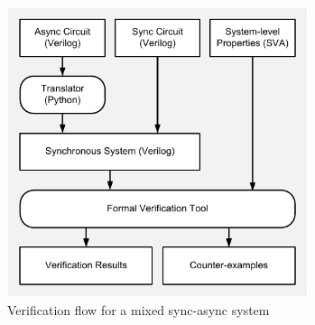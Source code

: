 
\begin{figure}[!t]
\begin{center}

\includegraphics[width=8.8cm]{figures/fig_mixed_flow}

\caption{
Verification flow for a mixed sync-async system
}

\label{fig_mixed_flow}
\end{center}

\end{figure}
